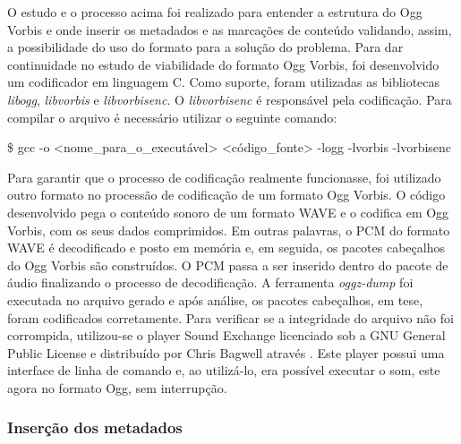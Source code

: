 O estudo e o processo acima foi realizado para entender a estrutura do Ogg Vorbis e onde inserir os metadados e as marcações de conteúdo validando, assim, a possibilidade do uso do formato para a solução do problema. Para dar continuidade no estudo de viabilidade do formato Ogg Vorbis, foi desenvolvido um codificador em linguagem C. Como suporte, foram utilizadas as bibliotecas \textit{libogg}, \textit{libvorbis} e \textit{libvorbisenc}. O \textit{libvorbisenc} é responsável pela codificação. Para compilar o arquivo é necessário utilizar o seguinte comando: 
	
   
   \$ gcc -o <nome\_para\_o\_executável> <código\_fonte> -logg -lvorbis -lvorbisenc


Para garantir que o processo de codificação realmente funcionasse, foi utilizado outro formato no processão de codificação de um formato Ogg Vorbis. O código desenvolvido pega o conteúdo sonoro de um formato WAVE e o codifica em Ogg Vorbis, com os seus dados comprimidos. Em outras palavras, o PCM do formato WAVE é decodificado e posto em memória e, em seguida, os pacotes cabeçalhos do Ogg Vorbis são construídos. O PCM passa a ser inserido dentro do pacote de áudio finalizando o processo de decodificação. A ferramenta \textit{oggz-dump} foi executada no arquivo gerado e após análise, os pacotes cabeçalhos, em tese, foram codificados corretamente. Para verificar se a integridade do arquivo não foi corrompida, utilizou-se o player Sound Exchange licenciado sob a GNU General Public License e distribuído por Chris Bagwell através \cite{sox}. Este player possui uma interface de linha de comando e, ao utilizá-lo, era possível executar o som, este agora no formato Ogg, sem interrupção. 




\subsubsection{Inserção dos metadados}

